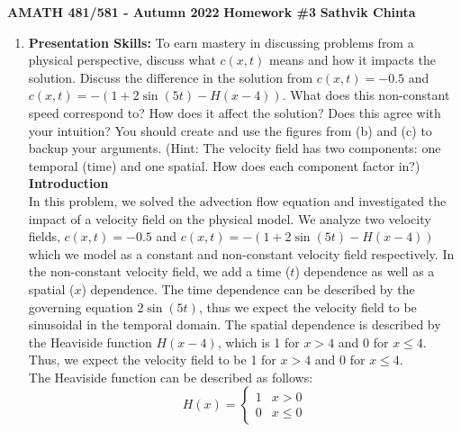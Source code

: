 \documentclass[a4paper,12pt, fleqn]{article}
\begin{document}
\begin{center}
\Large
\textbf{AMATH 481/581 - Autumn 2022}
\textbf{Homework \#3}
\textbf{Sathvik Chinta}
\normalsize
\end{center}
\begin{enumerate}
    \item 
        \textbf{Presentation Skills:} To earn mastery in discussing problems
        from a physical perspective, discuss what $c(x,t)$ means and how it
        impacts the solution. Discuss the difference in the solution from
        $c(x,t) = -0.5$ and $c(x,t) = -\left(1 + 2\sin(5t) - H(x-4)\right)$.
        What does this non-constant speed correspond to? How does it affect the
        solution? Does this agree with your intuition? You should create and
        use the figures from (b) and (c) to backup your arguments. 
        (Hint: The velocity field has two components: one temporal (time) and
        one spatial. How does each component factor in?)\\

        \textbf{Introduction}\\
        In this problem, we solved the advection flow equation and investigated 
        the impact of a velocity field on the physical model. We analyze two
        velocity fields, $c(x,t) = -0.5$ and $c(x,t) = -\left(1 + 2\sin(5t) - H(x-4)\right)$ 
        which we model as a constant and non-constant velocity field respectively. In 
        the non-constant velocity field, we add a time ($t$) dependence as well as a 
        spatial ($x$) dependence. The time dependence can be described by the governing 
        equation $2\sin(5t)$, thus we expect the velocity field to be sinusoidal in
        the temporal domain. The spatial dependence is described by the Heaviside
        function $H(x-4)$, which is 1 for $x > 4$ and 0 for $x \leq 4$. Thus, we expect
        the velocity field to be 1 for $x > 4$ and 0 for $x \leq 4$.\\

        The Heaviside function can be described as follows:\\

        \begin{equation}
            H(x) = \begin{cases}
                1 & x > 0 \\
                0 & x \leq 0
            \end{cases}
        \end{equation}\\



\end{enumerate}
\end{document}
